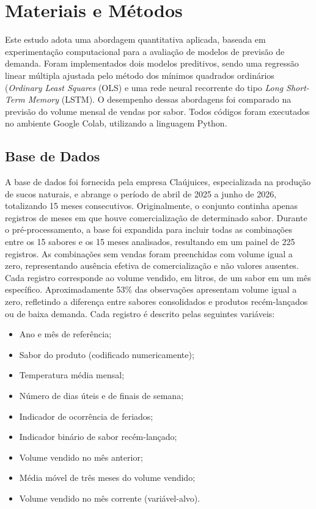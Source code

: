 \section{Materiais e Métodos}
\label{sec-materiais}

Este estudo adota uma abordagem quantitativa aplicada, baseada em experimentação computacional para a avaliação de modelos de previsão de demanda. Foram implementados dois modelos preditivos, sendo uma regressão linear múltipla ajustada pelo método dos mínimos quadrados ordinários (\textit{Ordinary Least Squares} (OLS) e uma rede neural recorrente do tipo \textit{Long Short-Term Memory} (LSTM). O desempenho dessas abordagens foi comparado na previsão do volume mensal de vendas por sabor. Todos códigos foram executados no ambiente Google Colab, utilizando a linguagem Python.

\subsection{Base de Dados}

A base de dados foi fornecida pela empresa Claújuices, especializada na produção de sucos naturais, e abrange o período de abril de 2025 a junho de 2026, totalizando 15 meses consecutivos. Originalmente, o conjunto continha apenas registros de meses em que houve comercialização de determinado sabor. Durante o pré-processamento, a base foi expandida para incluir todas as combinações entre os 15 sabores e os 15 meses analisados, resultando em um painel de 225 registros. As combinações sem vendas foram preenchidas com volume igual a zero, representando ausência efetiva de comercialização e não valores ausentes. Cada registro corresponde ao volume vendido, em litros, de um sabor em um mês específico. Aproximadamente 53\% das observações apresentam volume igual a zero, refletindo a diferença entre sabores consolidados e produtos recém-lançados ou de baixa demanda. Cada registro é descrito pelas seguintes variáveis:

\begin{itemize}
\item Ano e mês de referência;
\item Sabor do produto (codificado numericamente);
\item Temperatura média mensal;
\item Número de dias úteis e de finais de semana;
\item Indicador de ocorrência de feriados;
\item Indicador binário de sabor recém-lançado;
\item Volume vendido no mês anterior;
\item Média móvel de três meses do volume vendido;
\item Volume vendido no mês corrente (variável-alvo).
\end{itemize}

